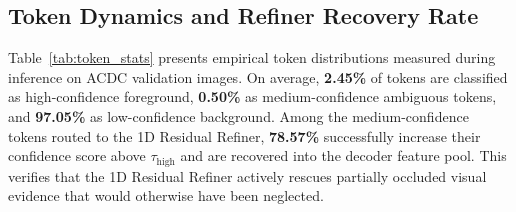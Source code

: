 \documentclass[conference]{IEEEtran}
\begin{document}
\begin{table}[t]
\centering
\caption{Hardware and Computational Profile (NVIDIA RTX 2050, $640\times 640$, Batch Size 1, FP32)}
\label{tab:hardware}
\end{table}

\begin{table}[t]
\centering
\caption{Token Partitioning Dynamics and Recovery Statistics on ACDC Rain Validation Set}
\label{tab:token_stats}
\end{table}

\subsection{Token Dynamics and Refiner Recovery Rate}
Table~\ref{tab:token_stats} presents empirical token distributions measured during inference on ACDC validation images.
On average, \textbf{2.45\%} of tokens are classified as high-confidence foreground, \textbf{0.50\%} as medium-confidence ambiguous tokens, and \textbf{97.05\%} as low-confidence background.
Among the medium-confidence tokens routed to the 1D Residual Refiner, \textbf{78.57\%} successfully increase their confidence score above $\tau_{\text{high}}$ and are recovered into the decoder feature pool. This verifies that the 1D Residual Refiner actively rescues partially occluded visual evidence that would otherwise have been neglected.
\end{document}
